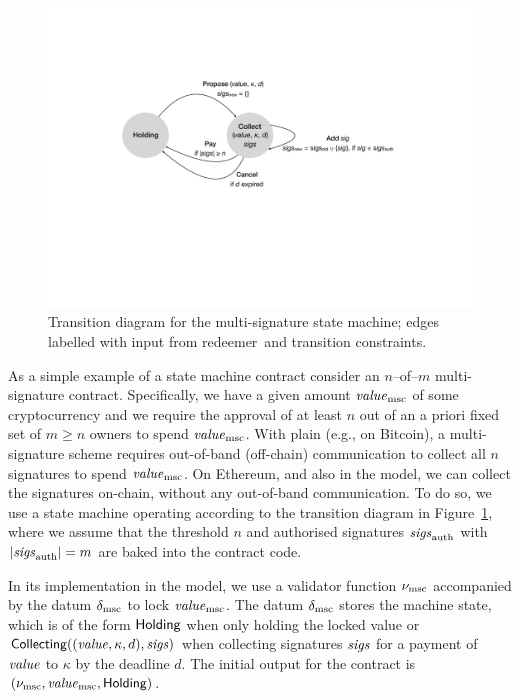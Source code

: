 \begin{figure}[t]
  \centering 
  \includegraphics[width=\textwidth]{EUTxO_MultiSig_States.pdf}
  \caption{Transition diagram for the multi-signature state machine; edges labelled with input from redeemer and transition constraints.}
  \label{fig:multisig-machine}
\end{figure}
%
As a simple example of a state machine contract consider an $n$--of--$m$
multi-signature contract. Specifically, we have a given amount
$\mathit{value}_{\mathrm{msc}}$ of some cryptocurrency and we require the approval of at
least $n$ out of an a priori fixed set of $m \geq n$ owners to spend
$\mathit{value}_{\mathrm{msc}}$. With plain \UTXO{} (e.g., on Bitcoin), a multi-signature
scheme requires out-of-band (off-chain) communication to collect all
$n$ signatures to spend $\mathit{value}_{\mathrm{msc}}$. On Ethereum, and also in the
\EUTXO{} model, we can collect the signatures on-chain, without any
out-of-band communication. To do so, we use a state machine operating
according to the transition diagram in
Figure~\ref{fig:multisig-machine}, where we assume that the threshold
$n$ and authorised signatures $\mathit{sigs}_{\mathrm{auth}}$ with \(|\mathit{sigs}_{\mathrm{auth}}| = m\)
are baked into the contract code.

In its implementation in the \EUTXO{} model, we use a validator
function $\nu_{\mathrm{msc}}$ accompanied by the datum $\delta_{\mathrm{msc}}$ to lock
$\mathit{value}_{\mathrm{msc}}$. The datum $\delta_{\mathrm{msc}}$ stores the machine state,
which is of the form \(\mathsf{Holding}\) when only holding the locked value
or \(\mathsf{Collecting}((\mathit{value}, \kappa, d), \mathit{sigs})\) when collecting
signatures $\mathit{sigs}$ for a payment of $\mathit{value}$ to $\kappa$ by the deadline
$d$. The initial output for the contract is \((\nu_{\mathrm{msc}}, \mathit{value}_{\mathrm{msc}},
\mathsf{Holding})\).

